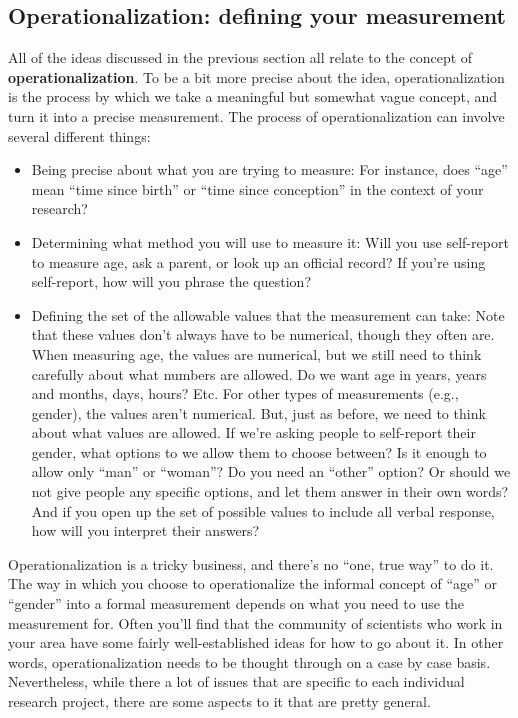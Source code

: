 \documentclass[
]{book}
\begin{document}
\subsection{Operationalization: defining your measurement}\label{operationalization-defining-your-measurement}

All of the ideas discussed in the previous section all relate to the concept of \textbf{operationalization}. To be a bit more precise about the idea, operationalization is the process by which we take a meaningful but somewhat vague concept, and turn it into a precise measurement. The process of operationalization can involve several different things:

\begin{itemize}
\item
  Being precise about what you are trying to measure: For instance, does ``age'' mean ``time since birth'' or ``time since conception'' in the context of your research?
\item
  Determining what method you will use to measure it: Will you use self-report to measure age, ask a parent, or look up an official record? If you're using self-report, how will you phrase the question?
\item
  Defining the set of the allowable values that the measurement can take: Note that these values don't always have to be numerical, though they often are. When measuring age, the values are numerical, but we still need to think carefully about what numbers are allowed. Do we want age in years, years and months, days, hours? Etc. For other types of measurements (e.g., gender), the values aren't numerical. But, just as before, we need to think about what values are allowed. If we're asking people to self-report their gender, what options to we allow them to choose between? Is it enough to allow only ``man'' or ``woman''? Do you need an ``other'' option? Or should we not give people any specific options, and let them answer in their own words? And if you open up the set of possible values to include all verbal response, how will you interpret their answers?
\end{itemize}

Operationalization is a tricky business, and there's no ``one, true way'' to do it. The way in which you choose to operationalize the informal concept of ``age'' or ``gender'' into a formal measurement depends on what you need to use the measurement for. Often you'll find that the community of scientists who work in your area have some fairly well-established ideas for how to go about it. In other words, operationalization needs to be thought through on a case by case basis. Nevertheless, while there a lot of issues that are specific to each individual research project, there are some aspects to it that are pretty general.
\end{document}
